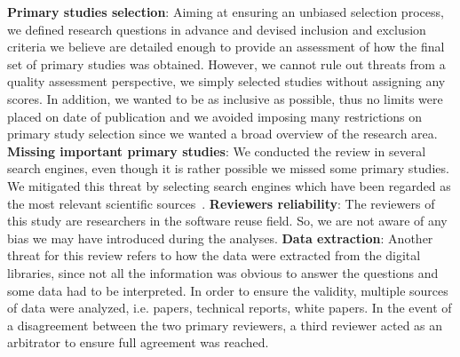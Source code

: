 

\textbf{Primary studies selection}: Aiming at ensuring an unbiased selection process, we defined research questions in advance and devised inclusion and exclusion criteria we believe are detailed enough to provide an assessment of how the final set of primary studies was obtained. However, we cannot rule out threats from a quality assessment perspective, we simply selected studies without assigning any scores. In addition, we wanted to be as inclusive as possible, thus no limits were placed on date of publication and we avoided imposing many restrictions on primary study selection since we wanted a broad overview of the research area. \textbf{Missing important primary studies}: We conducted the review in several search engines, even though it is rather possible we missed some primary studies. We mitigated this threat by selecting search engines which have been regarded as the most relevant scientific sources~\cite{Kitchenham}. \textbf{Reviewers reliability}: The reviewers of this study are researchers in the software reuse field. So, we are not aware of any bias we may have introduced during the analyses. \textbf{Data extraction}: Another threat for this review refers to how the data were extracted from the digital libraries, since not all the information was obvious to answer the questions and some data had to be interpreted. In order to ensure the validity, multiple sources of data were analyzed, i.e. papers, technical reports, white papers. In the event of a disagreement between the two primary reviewers, a third reviewer acted as an arbitrator to ensure full agreement was reached.